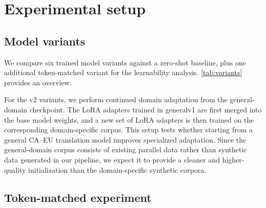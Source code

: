\documentclass[11pt,a4paper]{article}
\begin{document}
\section{Experimental setup}
\label{sec:setup}

\subsection{Model variants}

We compare six trained model variants against a zero-shot baseline,
plus one additional token-matched variant for the learnability analysis.
\autoref{tab:variants} provides an overview.

\begin{table}[H]
\scriptsize
\centering
{}
\caption{Model variants and their training lineage. litv1-tm
denotes the token-matched literary variant.}
\label{tab:variants}
\end{table}

For the v2 variants, we perform continued domain adaptation from the
general-domain checkpoint. The LoRA adapters trained in generalv1 are
first merged into the base model weights, and a new set of LoRA adapters
is then trained on the corresponding domain-specific corpus. This setup
tests whether starting from a general CA--EU translation model improves
specialized adaptation. Since the general-domain corpus consists of
existing parallel data rather than synthetic data generated in our
pipeline, we expect it to provide a cleaner and higher-quality
initialization than the domain-specific synthetic corpora.

\subsection{Token-matched experiment}
\end{document}
